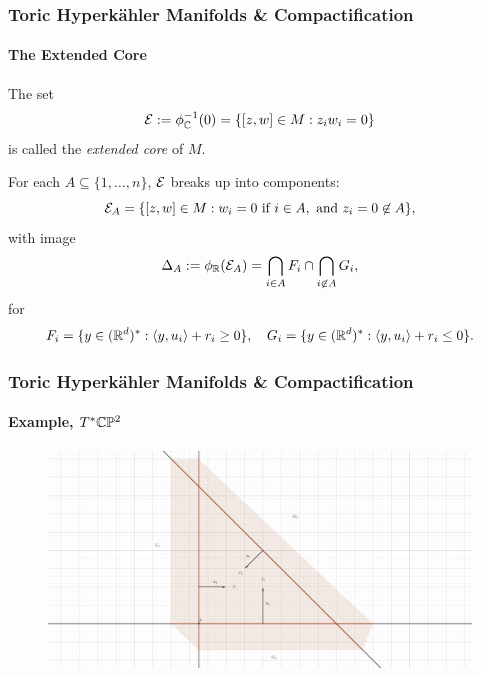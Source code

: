 \begin{frame}
	\frametitle{Toric Hyperk{\"a}hler Manifolds \& Compactification}
	\framesubtitle{The Extended Core}

\begin{defn}
	The set
	$$
		\mathcal{E} := \phi_{\mathbb{C}}^{-1}(0) = \{[z,w] \in M : z_{i}w_{i} = 0 \}
	$$
	is called the \emph{extended core} of $M$.
\end{defn}

For each $A \subseteq \{1,\ldots, n\}$, $\mathcal{E}$ breaks up into components:
$$
\mathcal{E}_{A} = \{[z,w] \in M : w_{i} = 0 \text{ if } i \in A, \text{ and } z_{i} = 0 \not\in A   \},
$$ 
with image
$$
\Delta_{A} := \phi_{\mathbb{R}}(\mathcal{E}_{A}) = \bigcap_{i \in A}F_{i} \cap \bigcap_{i\not\in A} G_{i}, 
$$
for
$$
	F_{i} = \{y \in (\mathbb{R}^{d})^{\ast}: \langle y, u_{i}\rangle + r_{i} \geq 0 \},\quad G_{i} = \{y \in (\mathbb{R}^{d})^{\ast}: \langle y,u_{i}\rangle + r_{i} \leq 0 \}.
$$

\end{frame}

\begin{frame}
	\frametitle{Toric Hyperk{\"a}hler Manifolds \& Compactification}
	\framesubtitle{Example, $T^{\ast}\mathbb{C}\mathbb{P}^{2}$}

	\begin{figure}
		\centering
		\includegraphics[width=1.2\linewidth]{figures/cp2-components}
	\end{figure}

\end{frame}

